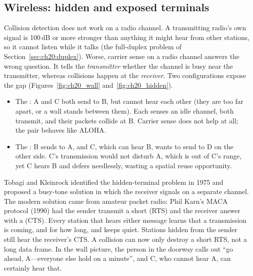 
\subsection{Wireless: hidden and exposed terminals}

Collision detection does not work on a radio channel. A transmitting radio's own signal is 100\,dB or more
stronger than anything it might hear from other stations, so it cannot listen while it talks (the
full-duplex problem of Section~\ref{sec:ch20:duplex}). Worse, carrier sense on a radio channel answers the
wrong question. It tells the \emph{transmitter} whether the channel is busy near the transmitter, whereas
collisions happen at the \emph{receiver}. Two configurations expose the gap
(Figures~\ref{fig:ch20_wall} and~\ref{fig:ch20_hidden}).
\begin{itemize}
\item The : A and C both send to B, but cannot hear each other (they are too far
apart, or a wall stands between them). Each senses an idle channel, both transmit, and their packets
collide at B. Carrier sense does not help at all; the pair behaves like ALOHA.
\item The : B sends to A, and C, which can hear B, wants to send to D on the other
side. C's transmission would not disturb A, which is out of C's range, yet C hears B and defers needlessly,
wasting a spatial reuse opportunity.
\end{itemize}

Tobagi and Kleinrock identified the hidden-terminal problem in 1975 and proposed a busy-tone solution in
which the receiver signals on a separate channel. The modern solution came from amateur packet radio: Phil
Karn's MACA protocol (1990) had the sender transmit a short  (RTS) and the receiver
answer with a  (CTS). Every station that hears either message learns that a transmission
is coming, and for how long, and keeps quiet. Stations hidden from the sender still hear the receiver's CTS.
A collision can now only destroy a short RTS, not a long data frame. In the wall picture, the person in the
doorway calls out ``go ahead, A---everyone else hold on a minute'', and C, who cannot hear A, can certainly
hear that.

